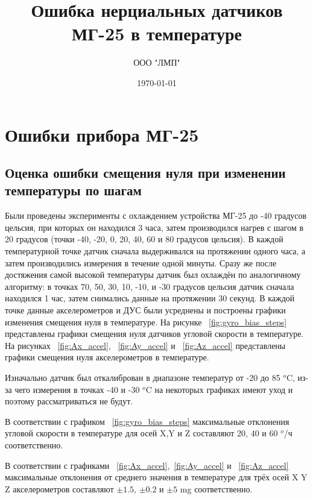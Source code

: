 \documentclass[a4paper,12pt]{article}
\author{ООО "ЛМП"} %
\title{Ошибка нерциальных датчиков МГ-25 в температуре}  %
\date{\today} %
\begin{document}
\maketitle

\section{Ошибки прибора МГ-25}
\subsection{Оценка ошибки смещения нуля при изменении температуры по шагам}
Были проведены эксперименты с охлаждением устройства МГ-25 до -40 градусов цельсия, при которых он находился 3 часа, затем производился нагрев с шагом в 20 градусов (точки -40, -20, 0, 20, 40, 60 и 80 градусов цельсия). В каждой температурной точке датчик сначала выдерживался на протяжении одного часа, а затем производились измерения в течение одной минуты. Сразу же после достяжения самой высокой температуры датчик был охлаждён по аналогичному алгоритму: в точках 70, 50, 30, 10, -10, и -30 градусов цельсия датчик сначала находился 1 час, затем снимались данные на протяжении 30 секунд. В каждой точке данные акселерометров и ДУС были усреднены и построены графики изменения смещения нуля в температуре. На рисунке ~\ref{fig:gyro_bias_steps} представлены графики смещения нуля датчиков угловой скорости в температуре. На рисунках ~\ref{fig:Ax_accel}, ~\ref{fig:Ay_accel} и ~\ref{fig:Az_accel} представлены графики смещения нуля акселерометров в температуре.

Изначально датчик был откалиброван в диапазоне температур от -20 до 85 $^o$C, из-за чего измерения в точках -40 и -30 $^o$C на некоторых графиках имеют уход и поэтому рассматриваться не будут.

В соответствии с графиком ~\ref{fig:gyro_bias_steps} максимальные отклонения угловой скорости в температуре для осей X,Y и Z составляют 20, 40 и  60 $^o$/ч соответственно.

В соответствии с графиками ~\ref{fig:Ax_accel},~\ref{fig:Ay_accel} и ~\ref{fig:Az_accel} максимальные отклонения от среднего значения в температуре для трёх осей X Y Z акселерометров составляют $\pm1.5$, $\pm0.2$ и  $\pm5$ mg  соответственно.
\end{document}
